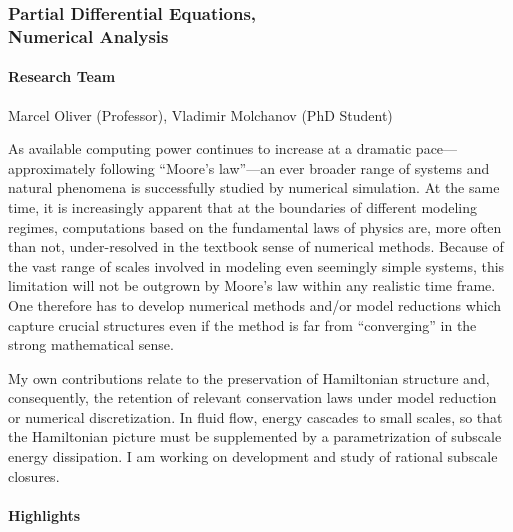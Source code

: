 \subsubsection[Partial Differential Equations, Numerical Analysis]{Partial Differential Equations, \\ Numerical Analysis}

\paragraph{Research Team}
Marcel Oliver (Professor), Vladimir Molchanov (PhD Student)

\medskip


As available computing power continues to increase at a dramatic
pace---approximately following ``Moore's law''---an ever broader range
of systems and natural phenomena is successfully studied by numerical
simulation.  At the same time, it is increasingly apparent that at the
boundaries of different modeling regimes, computations based on the
fundamental laws of physics are, more often than not, under-resolved
in the textbook sense of numerical methods.  Because of the vast range
of scales involved in modeling even seemingly simple systems, this
limitation will not be outgrown by Moore's law within any realistic
time frame.  One therefore has to develop numerical methods and/or
model reductions which capture crucial structures even if the method
is far from ``converging'' in the strong mathematical sense.

My own contributions relate to the preservation of Hamiltonian
structure and, consequently, the retention of relevant conservation
laws under model reduction or numerical discretization.  In fluid
flow, energy cascades to small scales, so that the Hamiltonian picture
must be supplemented by a parametrization of subscale energy
dissipation.  I am working on development and study of rational
subscale closures.


\paragraph{Highlights}

